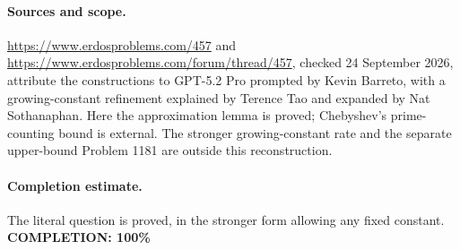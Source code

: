 \paragraph{Sources and scope.}
\url{https://www.erdosproblems.com/457} and
\url{https://www.erdosproblems.com/forum/thread/457},
checked 24 September 2026, attribute the constructions to GPT-5.2 Pro
prompted by Kevin Barreto, with a growing-constant refinement explained
by Terence Tao and expanded by Nat Sothanaphan.
Here the approximation lemma is proved; Chebyshev's prime-counting
bound is external. The stronger growing-constant rate and the separate
upper-bound Problem 1181 are outside this reconstruction.

\paragraph{Completion estimate.}
The literal question is proved, in the stronger form allowing any fixed constant.
\textbf{COMPLETION: 100\%}
